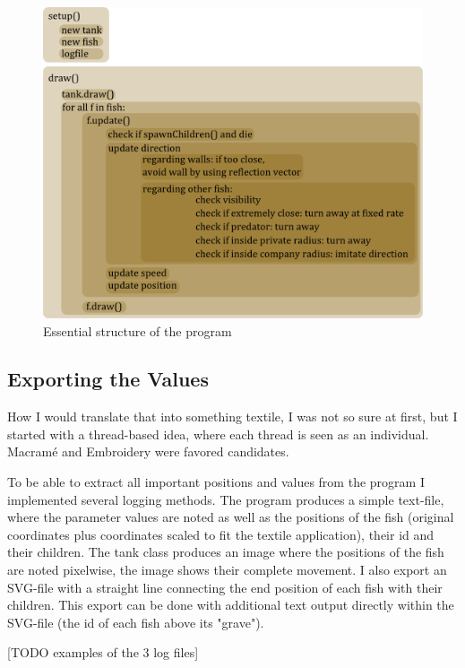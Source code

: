 \documentclass{scrartcl}
\begin{document}
\begin{figure}[h]
        \centering
        \includegraphics[width=\textwidth]{implementationsketch}
        \caption{Essential structure of the program}
        
\end{figure}

\subsection{Exporting the Values}
How I would translate that into something textile, I was not so sure at first, but I started with a thread-based idea, where each thread is seen as an individual. Macramé and Embroidery were favored candidates.

To be able to extract all important positions and values from the program I implemented several logging methods. The program produces a simple text-file, where the parameter values are noted as well as the positions of the fish (original coordinates plus coordinates scaled to fit the textile application), their id and their children. The tank class produces an image where the positions of the fish are noted pixelwise, the image shows their complete movement. I also export an SVG-file with a straight line connecting the end position of each fish with their children. This export can be done with additional text output directly within the SVG-file (the id of each fish above its "grave").

[TODO examples of the 3 log files]
\end{document}
